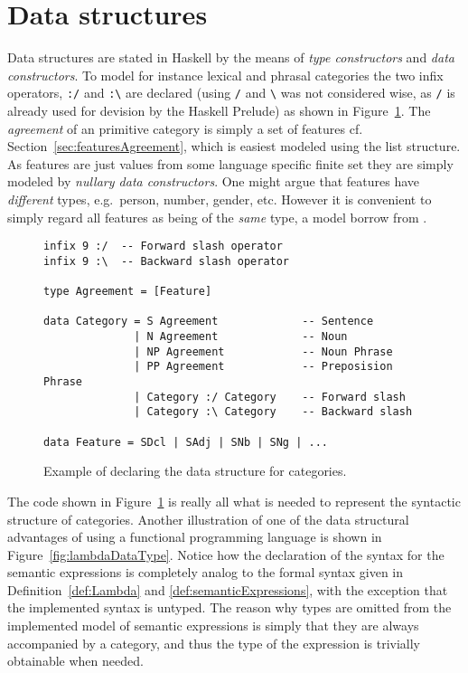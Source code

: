 \section{Data structures}
Data structures are stated in Haskell by the means of \emph{type constructors} and \emph{data constructors}. To model for instance lexical and phrasal categories the two infix operators, \texttt{:/} and \texttt{:\textbackslash} are declared (using \texttt{/} and \texttt{\textbackslash} was not considered wise, as \texttt{/} is already used for devision by the Haskell Prelude) as shown in Figure~\ref{fig:categoryDataType}. The \emph{agreement} of an primitive category is simply a set of features cf. Section~\ref{sec:featuresAgreement}, which is easiest modeled using the list structure. As features are just values from some language specific finite set they are simply modeled by \emph{nullary data constructors}. One might argue that features have \emph{different} types, e.g.\ person, number, gender, etc. However it is convenient to simply regard all features as being of the \emph{same} type, a model borrow from \citeauthor{cs} . %

\begin{figure}[ht]
\begin{cframed}{.9\textwidth}
\vspace{-8pt}
\begin{lstlisting}[language=GHC]
infix 9 :/  -- Forward slash operator
infix 9 :\  -- Backward slash operator

type Agreement = [Feature]

data Category = S Agreement             -- Sentence
              | N Agreement             -- Noun
              | NP Agreement            -- Noun Phrase
              | PP Agreement            -- Preposision Phrase
              | Category :/ Category    -- Forward slash
              | Category :\ Category    -- Backward slash

data Feature = SDcl | SAdj | SNb | SNg | ...
\end{lstlisting}	
\end{cframed}
\caption{Example of declaring the data structure for categories.}
\label{fig:categoryDataType}
\end{figure}

The code shown in Figure~\ref{fig:categoryDataType} is really all what is needed to represent the syntactic structure of categories. Another illustration of one of the data structural advantages of using a functional programming language is shown in Figure~\ref{fig:lambdaDataType}. Notice how the declaration of the syntax for the semantic expressions is completely analog to the formal syntax given in Definition~\ref{def:Lambda} and \ref{def:semanticExpressions}, with the exception that the implemented syntax is untyped. The reason why types are omitted from the implemented model of semantic expressions is simply that they are always accompanied by a category, and thus the type of the expression is trivially obtainable when needed.

